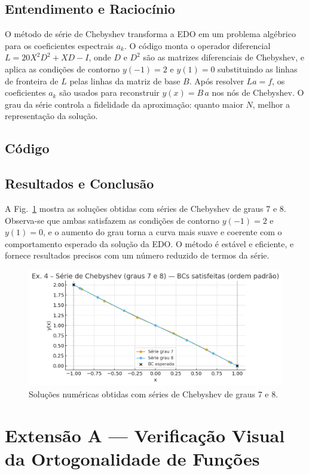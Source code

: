 \documentclass[11pt,a4paper]{article}
\begin{document}
\subsection*{Entendimento e Raciocínio}
O método de série de Chebyshev transforma a EDO em um problema algébrico para
os coeficientes espectrais $a_k$. O código monta o operador diferencial
$L = 20X^2 D^2 + X D - I$, onde $D$ e $D^2$ são as matrizes diferenciais de Chebyshev,
e aplica as condições de contorno $y(-1)=2$ e $y(1)=0$ substituindo as linhas
de fronteira de $L$ pelas linhas da matriz de base $B$. Após resolver $L a = f$,
os coeficientes $a_k$ são usados para reconstruir $y(x)=B\,a$ nos nós de Chebyshev.
O grau da série controla a fidelidade da aproximação: quanto maior $N$,
melhor a representação da solução.

\subsection*{Código}


\subsection*{Resultados e Conclusão}
A Fig.~\ref{fig:ex4_serie_cheb_numerica} mostra as soluções obtidas
com séries de Chebyshev de graus 7 e 8.
Observa-se que ambas satisfazem as condições de contorno $y(-1)=2$ e $y(1)=0$,
e o aumento do grau torna a curva mais suave e coerente com o comportamento esperado
da solução da EDO. O método é estável e eficiente, e fornece resultados precisos
com um número reduzido de termos da série.

\begin{figure}[h!]\centering
\includegraphics[width=0.8\linewidth]{figures/ex4_serie_cheb_numerica.png}
\caption{Soluções numéricas obtidas com séries de Chebyshev de graus 7 e 8.}
\label{fig:ex4_serie_cheb_numerica}
\end{figure}


\section{Extensão A — Verificação Visual da Ortogonalidade de Funções}
\end{document}
